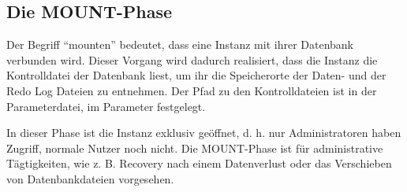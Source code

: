       \subsection{Die MOUNT-Phase}
        Der Begriff \enquote{mounten} bedeutet, dass eine Instanz mit ihrer Datenbank verbunden wird. Dieser Vorgang wird dadurch realisiert, dass die Instanz die Kontrolldatei der Datenbank liest, um ihr die Speicherorte der Daten- und der Redo Log Dateien zu entnehmen. Der Pfad zu den Kontrolldateien ist in der Parameterdatei, im Parameter  festgelegt.

        In dieser Phase ist die Instanz exklusiv ge\"offnet, d. h. nur Administratoren haben Zugriff, normale Nutzer noch nicht. Die MOUNT-Phase ist f\"ur administrative T\"agtigkeiten, wie z. B. Recovery nach einem Datenverlust oder das Verschieben von Datenbankdateien vorgesehen.

